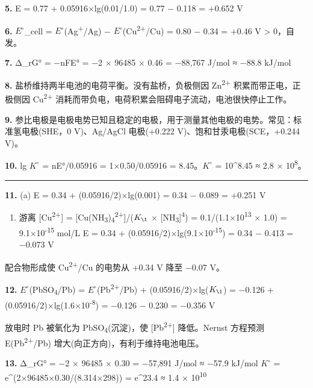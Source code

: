 \textbf{5.} E = 0.77 + 0.05916×lg(0.01/1.0) = 0.77 − 0.118 = +0.652 V

\textbf{6.} \(E^{\circ}\)\_cell = \(E^{\circ}\)(Ag\textsuperscript{+}/Ag) − \(E^{\circ}\)(Cu\textsuperscript{2+}/Cu) = 0.80 − 0.34 = +0.46 V \textgreater{} 0，自发。

\textbf{7.} Δ\_rG° = −nFE° = −2 × 96485 × 0.46 = −88,767 J/mol ≈ −88.8 kJ/mol

\textbf{8.} 盐桥维持两半电池的电荷平衡。没有盐桥，负极侧因 Zn\textsuperscript{2+} 积累而带正电，正极侧因 Cu\textsuperscript{2+} 消耗而带负电，电荷积累会阻碍电子流动，电池很快停止工作。

\textbf{9.} 参比电极是电极电势已知且稳定的电极，用于测量其他电极的电势。常见：标准氢电极(SHE，0 V)、Ag/AgCl 电极(+0.222 V)、饱和甘汞电极(SCE，+0.244 V)。

\textbf{10.} lg \(K^{\circ}\) = nE°/0.05916 = 1×0.50/0.05916 = 8.45。\(K^{\circ}\) = 10\^{}8.45 ≈ 2.8 × 10\textsuperscript{8}。

\begin{center}\rule{0.5\linewidth}{0.5pt}\end{center}

\textbf{11.}
(a) E = 0.34 + (0.05916/2)×lg(0.001) = 0.34 − 0.089 = +0.251 V

\begin{enumerate}
\def\labelenumi{(\alph{enumi})}
\setcounter{enumi}{1}
\tightlist
\item
  游离 {[}Cu\textsuperscript{2+}{]} = {[}Cu(NH\textsubscript{3})\textsubscript{4}\textsuperscript{2+}{]}/(\(K_{\1}\) × {[}NH\textsubscript{3}{]}\textsuperscript{4}) = 0.1/(1.1×10\textsuperscript{13} × 1.0) = 9.1×10\textsuperscript{-15} mol/L
  E = 0.34 + (0.05916/2)×lg(9.1×10\textsuperscript{-15}) = 0.34 − 0.413 = −0.073 V
\end{enumerate}

配合物形成使 Cu\textsuperscript{2+}/Cu 的电势从 +0.34 V 降至 −0.07 V。

\textbf{12.} \(E^{\circ}\)(PbSO\textsubscript{4}/Pb) = \(E^{\circ}\)(Pb\textsuperscript{2+}/Pb) + (0.05916/2)×lg(\(K_{\1}\)) = −0.126 + (0.05916/2)×lg(1.6×10\textsuperscript{-8}) = −0.126 − 0.230 = −0.356 V

放电时 Pb 被氧化为 PbSO\textsubscript{4}(沉淀)，使 {[}Pb\textsuperscript{2+}{]} 降低。Nernst 方程预测 E(Pb\textsuperscript{2+}/Pb) 增大(向正方向)，有利于维持电池电压。

\textbf{13.} Δ\_rG° = −2 × 96485 × 0.30 = −57,891 J/mol ≈ −57.9 kJ/mol
\(K^{\circ}\) = e\^{}(2×96485×0.30/(8.314×298)) = e\^{}23.4 ≈ 1.4 × 10\textsuperscript{10}

